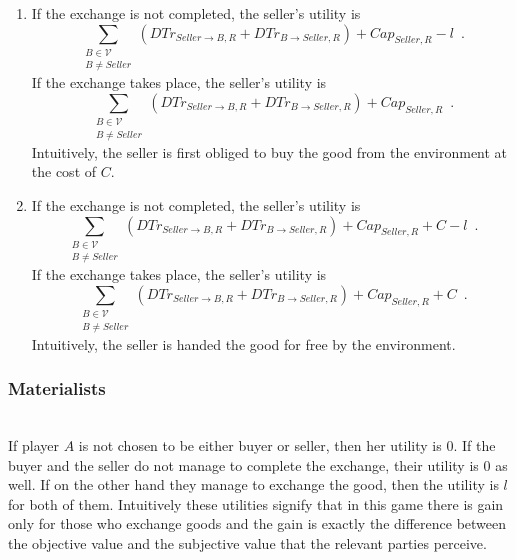     \begin{enumerate}
      \item If the exchange is not completed, the seller's utility is 
      \begin{equation*}
        \sum\limits_{\substack{B \in \mathcal{V} \\ B \neq Seller}}\left(DTr_{Seller \rightarrow B, R} + DTr_{B \rightarrow
	Seller, R}\right) + Cap_{Seller, R} - l \enspace.
      \end{equation*}
      If the exchange takes place, the seller's utility is
      \begin{equation*}
        \sum\limits_{\substack{B \in \mathcal{V} \\ B \neq Seller}}\left(DTr_{Seller \rightarrow B, R} + DTr_{B \rightarrow
	Seller, R}\right) + Cap_{Seller, R} \enspace.
      \end{equation*}
      Intuitively, the seller is first obliged to buy the good from the environment at the cost of $C$.

      \item If the exchange is not completed, the seller's utility is
      \begin{equation*}
        \sum\limits_{\substack{B \in \mathcal{V} \\ B \neq Seller}}\left(DTr_{Seller \rightarrow B, R} + DTr_{B \rightarrow
	Seller, R}\right) + Cap_{Seller, R} + C - l \enspace.
      \end{equation*}
      If the exchange takes place, the seller's utility is
      \begin{equation*}
        \sum\limits_{\substack{B \in \mathcal{V} \\ B \neq Seller}}\left(DTr_{Seller \rightarrow B, R} + DTr_{B \rightarrow
	Seller, R}\right) + Cap_{Seller, R} + C \enspace.
      \end{equation*}
      Intuitively, the seller is handed the good for free by the environment.
    \end{enumerate}

  \subsubsection{Materialists} \ \\

    If player $A$ is not chosen to be either buyer or seller, then her utility is 0. If the buyer and the seller do not
    manage to complete the exchange, their utility is 0 as well. If on the other hand they manage to exchange the good, then
    the utility is $l$ for both of them. Intuitively these utilities signify that in this game there is gain only for those
    who exchange goods and the gain is exactly the difference between the objective value and the subjective value that the
    relevant parties perceive.
